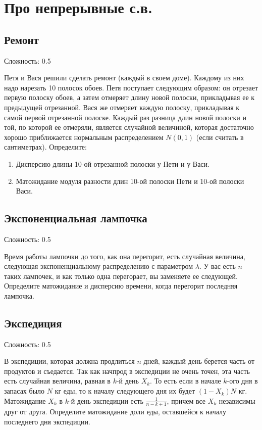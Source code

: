 \documentclass[12pt]{article}
\begin{document}
\section{Про непрерывные с.в.}

\subsection{Ремонт}

Сложность: 0.5

Петя и Вася решили сделать ремонт (каждый в своем доме). Каждому из них надо нарезать 10 полосок обоев. Петя поступает следующим образом: он отрезает первую полоску обоев, а затем отмеряет длину новой полоски, прикладывая ее к предыдущей отрезанной. Вася же отмеряет каждую полоску, прикладывая к самой первой отрезанной полоске. Каждый раз разница длин новой полоски и той, по которой ее отмеряли, является случайной величиной, которая достаточно хорошо приближается нормальным распределением $N(0, 1)$ (если считать в сантиметрах). Определите:
\begin{enumerate}
    \item Дисперсию длины 10-ой отрезанной полоски у Пети и у Васи.
    \item Матожидание модуля разности длин 10-ой полоски Пети и 10-ой полоски Васи. 
\end{enumerate}

\subsection{Экспоненциальная лампочка}

Сложность: 0.5

Время работы лампочки до того, как она перегорит, есть случайная величина, следующая экспоненциальному распределению с параметром $\lambda$. У вас есть $n$ таких лампочек, и как только одна перегорает, вы заменяете ее следующей. Определите матожидание и дисперсию времени, когда перегорит последняя лампочка.

\subsection{Экспедиция}

Сложность: 0.5

В экспедиции, которая должна продлиться $n$ дней, каждый день берется часть от продуктов и съедается. Так как начпрод в экспедиции не очень точен, эта часть есть случайная величина, равная в $k$-й день $X_k$. То есть если в начале $k$-ого дня в запасах было $N$ кг еды, то к началу следующего дня их будет $(1 - X_k)N$ кг. Матожидание $X_k$ в $k$-й день экспедиции есть $\frac{1}{n - k + 1}$, причем все $X_k$ независимы друг от друга. Определите матожидание доли еды, оставшейся к началу последнего дня экспедиции. 
\end{document}
